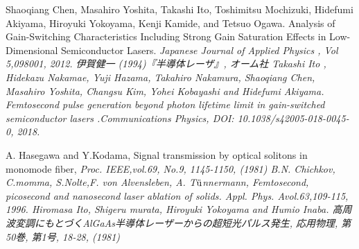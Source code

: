 \begin{thebibliography}{99}
 Shaoqiang Chen, Masahiro Yoshita, Takashi Ito, Toshimitsu Mochizuki, Hidefumi Akiyama, Hiroyuki Yokoyama, Kenji Kamide, and Tetsuo Ogawa. Analysis of Gain-Switching Characteristics Including Strong Gain Saturation Effects in Low-Dimensional Semiconductor Lasers. \sl Japanese Journal of Applied  Physics \rm , Vol 5,098001, 2012.
 伊賀健一 (1994)『半導体レーザ』, オーム社
Takashi Ito
, Hidekazu Nakamae, Yuji Hazama, Takahiro Nakamura, Shaoqiang Chen, Masahiro Yoshita, Changsu Kim, Yohei Kobayashi and Hidefumi Akiyama.
Femtosecond pulse generation beyond photon lifetime limit in gain-switched semiconductor lasers .\sl Communications Physics\rm , DOI: 10.1038/s42005-018-0045-0, 2018. 

 A. Hasegawa and Y.Kodama, Signal transmission by optical solitons in monomode fiber, \sl Proc. IEEE\rm ,vol.69, No.9, 1145-1150, (1981)
 B.N. Chichkov, C.momma, S.Nolte,F. von Alvensleben, A. T$\rm{\ddot{u}}$nnermann, Femtosecond, picosecond and nanosecond laser ablation of solids. \sl Appl. Phys. A\rm vol.63,109-115, 1996.
 Hiromasa Ito, Shigeru 
murata, Hiroyuki Yokoyama and Humio Inaba. 高周波変調にもとづくAlGaAs半導体レーザーからの超短光パルス発生, 応用物理, 第50巻, 第1号, 18-28, (1981)
\end{thebibliography}
